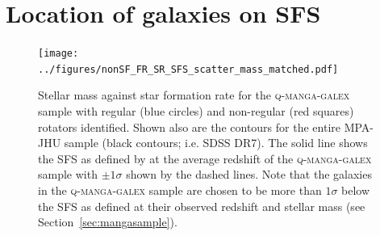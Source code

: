 \documentclass[useAMS,usenatbib]{mn2e}
\begin{document}

  

\appendix

\section{Location of galaxies on SFS}\label{asec:masvsfr}

\begin{figure}
\centering
\texttt{[image: ../figures/nonSF\_FR\_SR\_SFS\_scatter\_mass\_matched.pdf]}
\caption{Stellar mass against star formation rate for the \textsc{q-manga-galex} sample with regular (blue circles) and non-regular (red squares) rotators identified. Shown also are the contours for the entire MPA-JHU sample (black contours; i.e. SDSS DR7). The solid line shows the SFS as defined by \protect\cite{peng10} at the average redshift of the \textsc{q-manga-galex} sample with $\pm 1 \sigma$ shown by the dashed lines. Note that the galaxies in the \textsc{q-manga-galex} sample are chosen to be more than $1\sigma$ below the SFS as defined at their observed redshift and stellar mass (see Section~\protect\ref{sec:mangasample}).}
\label{fig:masvsfr}
\end{figure}
\end{document}
